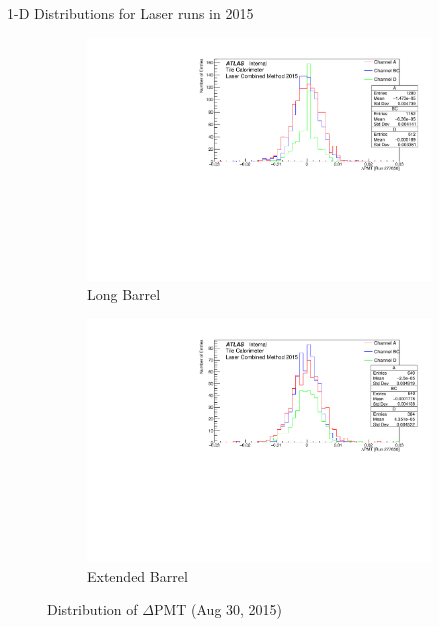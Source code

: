 \documentclass{beamer}
\begin{document}
\begin{frame}{1-D Distributions for Laser runs in 2015}
\begin{figure}[H]
\centering
\begin{subfigure} [t] {0.49\textwidth}
\includegraphics[width=\textwidth]{pmtLB2.pdf}
\caption{Long Barrel}
\end{subfigure}
\begin{subfigure} [t] {0.49\textwidth}
\includegraphics[width=\textwidth]{pmtEB2.pdf}
\caption{Extended Barrel}
\end{subfigure}
\caption{Distribution of $\Delta$PMT (Aug 30, 2015)}
\end{figure}
\end{frame}
\end{document}
